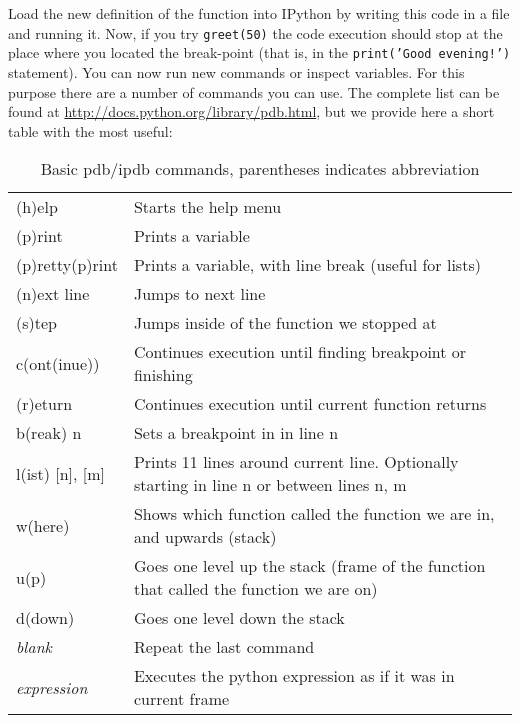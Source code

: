 Load the new definition of the function into IPython by writing this code in a
file and running it. Now, if you try \texttt{greet(50)} the code execution
should stop at the place where you located the break-point (that is, in the
\texttt{print('Good evening!')} statement). You can now run new commands or
inspect variables. For this purpose there are a number of commands you can use.
The complete list can be found at
\url{http://docs.python.org/library/pdb.html}, but we provide here a short
table with the most useful: 

\begin{table}[!h]
\begin{center}
\begin{tabular}{|l|l|}
\hline
(h)elp           & Starts the help menu\\
(p)rint          & Prints a variable\\
(p)retty(p)rint	 & Prints a variable, with line break (useful for lists)\\
\hline
(n)ext line      & Jumps to next line\\ 
(s)tep           & Jumps inside of the function we stopped at\\
c(ont(inue))     & Continues execution until finding breakpoint or finishing\\
(r)eturn         & Continues execution until current function returns\\
b(reak) n        & Sets a breakpoint in in line n\\
\hline
l(ist) [n], [m]  & Prints 11 lines around current line. Optionally starting in line n or between lines n, m\\
w(here)          & Shows which function called the function we are in, and upwards (stack\footnotemark)\\
u(p)             & Goes one level up the stack (frame of the function that called the function we are on)\\
d(down)          & Goes one level down the stack\\
\hline
\textit{blank}          & Repeat the last command\\ 
\textit{expression}     & Executes the python expression as if it was in current frame\\
\hline
\end{tabular}
\end{center}
\caption{\label{tb::pdbbasiccommands}Basic pdb/ipdb commands, parentheses indicates abbreviation}
\end{table}


